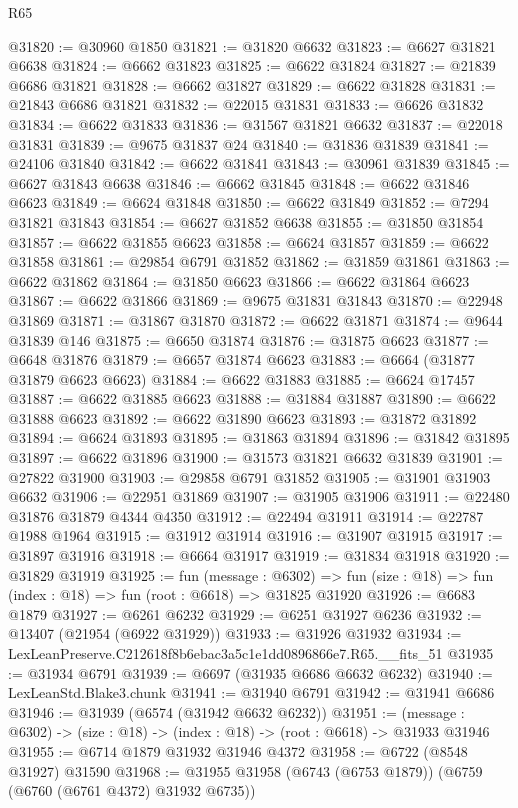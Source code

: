 \begin{lexlean}{R65}
\begin{coremodule}
{@31820 := @30960 @1850
@31821 := @31820 @6632
@31823 := @6627 @31821 @6638
@31824 := @6662 @31823
@31825 := @6622 @31824
@31827 := @21839 @6686 @31821
@31828 := @6662 @31827
@31829 := @6622 @31828
@31831 := @21843 @6686 @31821
@31832 := @22015 @31831
@31833 := @6626 @31832
@31834 := @6622 @31833
@31836 := @31567 @31821 @6632
@31837 := @22018 @31831
@31839 := @9675 @31837 @24
@31840 := @31836 @31839
@31841 := @24106 @31840
@31842 := @6622 @31841
@31843 := @30961 @31839
@31845 := @6627 @31843 @6638
@31846 := @6662 @31845
@31848 := @6622 @31846 @6623
@31849 := @6624 @31848
@31850 := @6622 @31849
@31852 := @7294 @31821 @31843
@31854 := @6627 @31852 @6638
@31855 := @31850 @31854
@31857 := @6622 @31855 @6623
@31858 := @6624 @31857
@31859 := @6622 @31858
@31861 := @29854 @6791 @31852
@31862 := @31859 @31861
@31863 := @6622 @31862
@31864 := @31850 @6623
@31866 := @6622 @31864 @6623
@31867 := @6622 @31866
@31869 := @9675 @31831 @31843
@31870 := @22948 @31869
@31871 := @31867 @31870
@31872 := @6622 @31871
@31874 := @9644 @31839 @146
@31875 := @6650 @31874
@31876 := @31875 @6623
@31877 := @6648 @31876
@31879 := @6657 @31874 @6623
@31883 := @6664 (@31877 @31879 @6623 @6623)
@31884 := @6622 @31883
@31885 := @6624 @17457
@31887 := @6622 @31885 @6623
@31888 := @31884 @31887
@31890 := @6622 @31888 @6623
@31892 := @6622 @31890 @6623
@31893 := @31872 @31892
@31894 := @6624 @31893
@31895 := @31863 @31894
@31896 := @31842 @31895
@31897 := @6622 @31896
@31900 := @31573 @31821 @6632 @31839
@31901 := @27822 @31900
@31903 := @29858 @6791 @31852
@31905 := @31901 @31903 @6632
@31906 := @22951 @31869
@31907 := @31905 @31906
@31911 := @22480 @31876 @31879 @4344 @4350
@31912 := @22494 @31911
@31914 := @22787 @1988 @1964
@31915 := @31912 @31914
@31916 := @31907 @31915
@31917 := @31897 @31916
@31918 := @6664 @31917
@31919 := @31834 @31918
@31920 := @31829 @31919
@31925 := fun (message : @6302) =>
  fun (size : @18) => fun (index : @18) => fun (root : @6618) => @31825 @31920
@31926 := @6683 @1879
@31927 := @6261 @6232
@31929 := @6251 @31927 @6236
@31932 := @13407 (@21954 (@6922 @31929))
@31933 := @31926 @31932
@31934 := LexLeanPreserve.C212618f8b6ebac3a5c1e1dd0896866e7.R65.__fits_51
@31935 := @31934 @6791
@31939 := @6697 (@31935 @6686 @6632 @6232)
@31940 := LexLeanStd.Blake3.chunk
@31941 := @31940 @6791
@31942 := @31941 @6686
@31946 := @31939 (@6574 (@31942 @6632 @6232))
@31951 := (message : @6302) -> (size : @18) -> (index : @18) -> (root : @6618) -> @31933 @31946
@31955 := @6714 @1879 @31932 @31946 @4372
@31958 := @6722 (@8548 @31927) @31590
@31968 := @31955 @31958 (@6743 (@6753 @1879)) (@6759 (@6760 (@6761 @4372) @31932 @6735))
}
\end{coremodule}
\end{lexlean}
